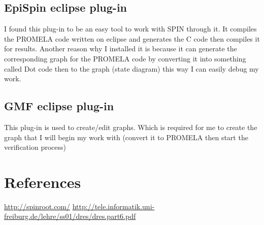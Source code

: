 \documentclass{article}
\begin{document}
\subsection{EpiSpin eclipse plug-in}
I found this plug-in to be an easy tool to work with SPIN through it. It compiles the PROMELA code written on eclipse and generates the C code then compiles it for results. Another reason why I installed it is because it can generate the corresponding graph for the PROMELA code by converting it into something called Dot code then to the graph (state diagram) this way I can easily debug my work.

\subsection{GMF eclipse plug-in}
This plug-in is used to create/edit graphs. Which is required for me to create the graph that I will begin my work with (convert it to PROMELA then start the verification process)


\newpage
\section{References}
\url{http://spinroot.com/}
\newline
\url{http://tele.informatik.uni-freiburg.de/lehre/ss01/dres/dres.part6.pdf}
\end{document}
